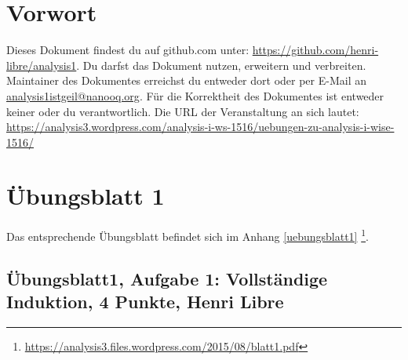 \documentclass[12pt,a4paper]{report}
\begin{document}
\newcommand \GruppeA {Henri Libre}

	\tableofcontents
	
	\newpage
	\setcounter{chapter}{-1}
\chapter{Vorwort}
	Dieses Dokument findest du auf github.com unter: \href{https://github.com/henri-libre/analysis1}{https://github.com/henri-libre/analysis1}. Du darfst das Dokument nutzen, erweitern und verbreiten. Maintainer des Dokumentes erreichst du entweder dort oder per E-Mail an \href{analysis1istgeil@nanooq.org}{analysis1istgeil@nanooq.org}. Für die Korrektheit des Dokumentes ist entweder keiner oder du verantwortlich. Die URL der Veranstaltung an sich lautet: \href{https://analysis3.wordpress.com/analysis-i-ws-1516/uebungen-zu-analysis-i-wise-1516/}{https://analysis3.wordpress.com/analysis-i-ws-1516/uebungen-zu-analysis-i-wise-1516/}
	
\chapter{Übungsblatt 1}
	
	Das entsprechende Übungsblatt befindet sich im Anhang \ref{uebungsblatt1} \footnote{\href{https://analysis3.files.wordpress.com/2015/08/blatt1.pdf}{https://analysis3.files.wordpress.com/2015/08/blatt1.pdf}}.

\newpage		
\section{Übungsblatt1, Aufgabe 1: Vollständige Induktion, 4 Punkte, \GruppeA}
	
\end{document}
